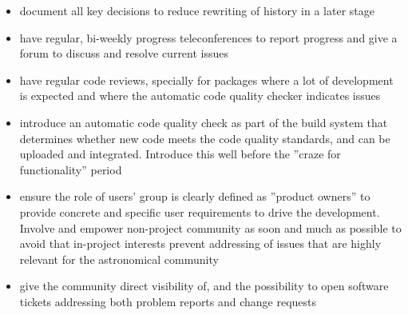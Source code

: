 \begin{itemize}
\item document all key decisions to reduce rewriting of history in a later stage
\item have regular, bi-weekly progress teleconferences to report progress and give a forum to discuss and resolve current issues
\item have regular code reviews, specially for packages where a lot of development is expected and where the automatic code quality checker indicates issues
\item introduce an automatic code quality check as part of the build system that determines whether new code meets the code quality standards, and can be uploaded and integrated. Introduce this well before the ''craze for functionality'' period
\item ensure the role of users' group is clearly defined as ''product owners'' to provide concrete and specific user requirements to drive the development. Involve and empower non-project community as soon and much as possible to avoid that in-project interests prevent addressing of issues that are highly relevant for the astronomical community
\item give the community direct visibility of, and the possibility to open software tickets addressing both problem reports and change requests
\end {itemize}

